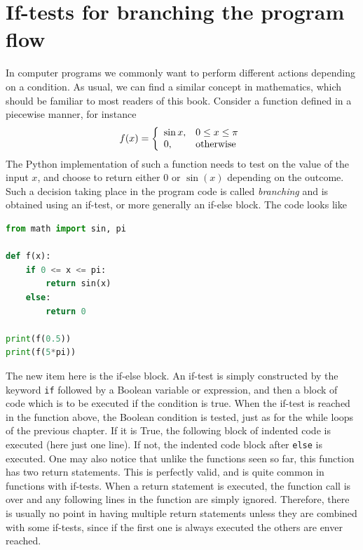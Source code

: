 \documentclass[graybox,envcountchap,sectrefs,final]{svmonodo}
\begin{document}
\section{If-tests for branching the program flow}
In computer programs we commonly want to perform different actions depending on a condition. As usual, we can find a similar
concept in mathematics, which should be familiar to most readers of this book.
Consider a function defined in a piecewise manner, for instance
\[
f(x) = \left\lbrace\begin{array}{ll}
\sin x, & 0\leq x\leq \pi\\ 
0, & \hbox{otherwise}
\end{array}\right.
\]
The Python implementation of such a function needs to test on the value of the input
$x$, and choose to return either 0 or $\sin(x)$ depending on the outcome. Such a decision taking place in the
program code is called \emph{branching} and is obtained using an if-test, or more generally an if-else block. The code looks like
\begin{lstlisting}[language=Python,style=blue1bar]
from math import sin, pi

def f(x):
    if 0 <= x <= pi:
        return sin(x)
    else:
        return 0

print(f(0.5))
print(f(5*pi))
\end{lstlisting}
The new item here is the if-else block. An if-test is simply constructed by the keyword \texttt{if} followed by a Boolean variable or
expression, and then a block of code which is to be executed if the condition is true.
When the if-test is reached in the function above, the Boolean condition is tested, just as for the
while loops of the previous chapter. If it is True, the following block of indented code is executed (here just one line).
If not, the indented code block after \texttt{else} is executed. One may also notice that unlike the functions seen so far, this
function has two return statements. This is perfectly valid, and is quite common in functions with if-tests.  When a return
statement is executed, the function call is over and any following lines in the function are
simply ignored. Therefore, there is usually no point in having multiple return statements unless they are combined with
some if-tests, since if the first one is always executed the others are enver reached.
\end{document}

